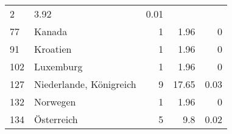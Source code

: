 \begin{longtable}{lXrrr}
       \num{2} &
       \num[round-mode=places,round-precision=2]{3.92} &
         \num[round-mode=places,round-precision=2]{0.01} \\

     77 &
     \multicolumn{1}{X}{ Kanada   } &


       \num{1} &
       \num[round-mode=places,round-precision=2]{1.96} &
         \num[round-mode=places,round-precision=2]{0} \\

     91 &
     \multicolumn{1}{X}{ Kroatien   } &


       \num{1} &
       \num[round-mode=places,round-precision=2]{1.96} &
         \num[round-mode=places,round-precision=2]{0} \\

     102 &
     \multicolumn{1}{X}{ Luxemburg   } &


       \num{1} &
       \num[round-mode=places,round-precision=2]{1.96} &
         \num[round-mode=places,round-precision=2]{0} \\

     127 &
     \multicolumn{1}{X}{ Niederlande, Königreich   } &


       \num{9} &
       \num[round-mode=places,round-precision=2]{17.65} &
         \num[round-mode=places,round-precision=2]{0.03} \\

     132 &
     \multicolumn{1}{X}{ Norwegen   } &


       \num{1} &
       \num[round-mode=places,round-precision=2]{1.96} &
         \num[round-mode=places,round-precision=2]{0} \\

     134 &
     \multicolumn{1}{X}{ Österreich   } &


       \num{5} &
       \num[round-mode=places,round-precision=2]{9.8} &
         \num[round-mode=places,round-precision=2]{0.02} \\


\end{longtable}
